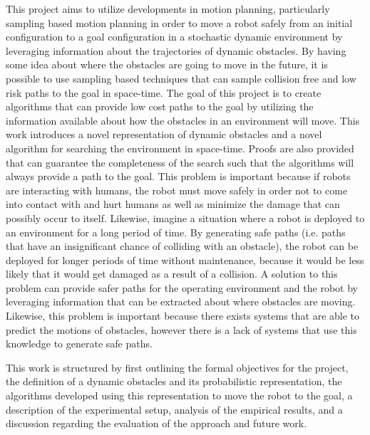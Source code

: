 This project aims to utilize developments in motion planning, particularly
sampling based motion planning in order to move a robot safely from an initial
configuration to a goal configuration in a stochastic dynamic environment by
leveraging information about the trajectories of dynamic obstacles. By having
some idea about where the obstacles are going to move in the future, it is
possible to use sampling based techniques that can sample collision free and
low risk paths to the goal in space-time. The goal of this project is to create
algorithms that can provide low cost paths to the goal by utilizing the
information available about how the obstacles in an environment will move. This
work introduces a novel representation of dynamic obstacles and a novel
algorithm for searching the environment in space-time.  Proofs are also
provided that can guarantee the completeness of the search such that the
algorithms will always provide a path to the goal. This problem is important
because if robots are interacting with humans, the robot must move safely in
order not to come into contact with and hurt humans as well as minimize the
damage that can possibly occur to itself. Likewise, imagine a situation where a
robot is deployed to an environment for a long period of time. By generating
safe paths (i.e. paths that have an insignificant chance of colliding with an
obstacle), the robot can be deployed for longer periods of time without
maintenance, because it would be less likely that it would get damaged as a
result of a collision. A solution to this problem can provide safer paths for
the operating environment and the robot by leveraging information that can be
extracted about where obstacles are moving.  Likewise, this problem is
important because there exists systems that are able to predict the motions of
obstacles, however there is a lack of systems that use this knowledge to
generate safe paths.

This work is structured by first outlining the formal objectives for the
project, the definition of a dynamic obstacles and its probabilistic
representation, the algorithms developed using this representation to move the
robot to the goal, a description of the experimental setup, analysis of the
empirical results, and a discussion regarding the evaluation of the approach
and future work.


